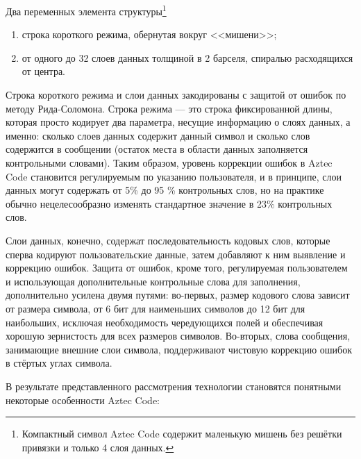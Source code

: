 Два переменных элемента структуры\footnote{
Компактный символ Aztec Code содержит маленькую мишень без 
решётки привязки и только 4 слоя данных.} 
\begin{enumerate}
\item строка короткого режима, обернутая вокруг <<мишени>>;

\item от одного до 32 слоев данных толщиной в 2 барселя, 
спиралью расходящихся от центра.
\end{enumerate}

Строка короткого режима и слои данных закодированы с защитой от ошибок по 
методу Рида-Соломона. Строка режима --- это строка фиксированной длины, 
которая просто кодирует два параметра, несущие информацию о слоях данных, 
а именно: сколько слоев данных содержит данный символ и сколько слов 
содержится в сообщении (остаток места в области данных заполняется 
контрольными словами). Таким образом, уровень коррекции ошибок в Aztec Code 
становится регулируемым по указанию пользователя, и в принципе, слои 
данных могут содержать от 5\% до 95 \% контрольных слов, но на практике 
обычно нецелесообразно изменять стандартное значение в 23\% контрольных слов.

Слои данных, конечно, содержат последовательность кодовых слов, которые 
сперва кодируют пользовательские данные, затем добавляют к ним выявление и 
коррекцию ошибок. Защита от ошибок, кроме того, регулируемая пользователем 
и использующая дополнительные контрольные слова для заполнения, дополнительно 
усилена двумя путями: во-первых, размер кодового слова зависит от размера 
символа, от 6 бит для наименьших символов до 12 бит для наибольших, исключая 
необходимость чередующихся полей и обеспечивая хорошую зернистость для всех 
размеров символов. Во-вторых, слова сообщения, занимающие внешние слои символа, 
поддерживают чистовую коррекцию ошибок в стёртых углах символа.

В результате представленного рассмотрения технологии становятся понятными 
некоторые особенности Aztec Code: 

